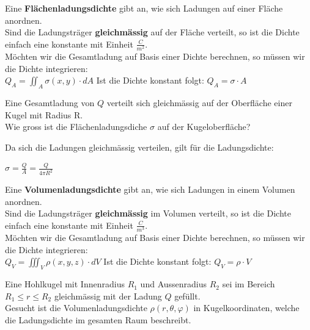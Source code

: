 \beginip
Eine \textbf{Flächenladungsdichte} gibt an, wie sich Ladungen auf einer Fläche anordnen. \\
Sind die Ladungsträger \textbf{gleichmässig} auf der Fläche verteilt, so ist die Dichte einfach eine konstante mit Einheit $\frac{C}{m^2}$. \\
Möchten wir die Gesamtladung auf Basis einer Dichte berechnen, so müssen wir die Dichte integrieren: \\
\formulaBegin
	$\displaystyle Q_{A} = \iint_A \sigma (x,y) \cdot dA$
\formulaEnd
Ist die Dichte konstant folgt:
\formulaBegin
	$\displaystyle Q_{A} = \sigma \cdot A$
\formulaEnd
\iend







\beginbsp
	Eine Gesamtladung von $Q$ verteilt sich gleichmässig auf der Oberfläche einer Kugel mit Radius R. \\
	Wie gross ist die Flächenladungsdiche $\sigma$ auf der Kugeloberfläche?
\iend


\beginbsp
	Da sich die Ladungen gleichmässig verteilen, gilt für die Ladungsdichte:
	\begin{center}
		$\displaystyle \sigma = \frac{Q}{A} = \frac{Q}{4\pi R^2}$
	\end{center}
\iend






\newpage

\beginip
Eine \textbf{Volumenladungsdichte} gibt an, wie sich Ladungen in einem Volumen anordnen. \\
Sind die Ladungsträger \textbf{gleichmässig} im Volumen verteilt, so ist die Dichte einfach eine konstante mit Einheit $\frac{C}{m^3}$. \\
Möchten wir die Gesamtladung auf Basis einer Dichte berechnen, so müssen wir die Dichte integrieren: \\
\formulaBegin
	$\displaystyle Q_{V} = \iiint_V \rho (x,y,z) \cdot dV$
\formulaEnd
Ist die Dichte konstant folgt:
\formulaBegin
	$\displaystyle Q_{V} = \rho \cdot V$
\formulaEnd
\iend




\beginbsp
Eine Hohlkugel mit Innenradius $R_1$ und Aussenradius $R_2$ sei im Bereich $ R_1 \leq r \leq R_2$ gleichmässig mit der Ladung $Q$ gefüllt. \\
Gesucht ist die Volumenladungsdichte $\rho(r,\theta,\varphi)$ in Kugelkoordinaten, welche die Ladungsdichte im gesamten Raum beschreibt.
\iend



